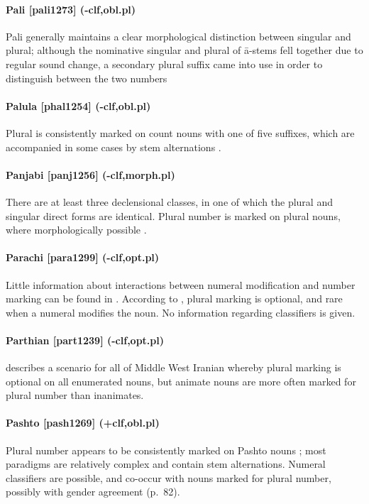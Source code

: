 \paragraph{Pali [pali1273] (-clf,obl.pl)}
Pali generally maintains a clear morphological distinction between singular and plural; although the nominative singular and plural of ā-stems fell together due to regular sound change, a secondary plural suffix came into use in order to distinguish between the two numbers \citep[150--1]{Oberlies2001}
\paragraph{Palula [phal1254] (-clf,obl.pl)}
Plural is consistently marked on count nouns with one of five suffixes, which are accompanied in some cases by stem alternations \citep[103--4]{Liljegren2016}.
\paragraph{Panjabi [panj1256] (-clf,morph.pl)}
There are at least three declensional classes, in one of which the plural and singular direct forms are identical. Plural number is marked on plural nouns, where morphologically possible \citep[214--5]{Bhatia1993}.
\paragraph{Parachi [para1299] (-clf,opt.pl)}
Little information about interactions between numeral modification and number marking can be found in \citet{Kieffer2009}. According to \citet[50]{Morgenstierne1929}, plural marking is optional, and rare when a numeral modifies the noun. No information regarding classifiers is given.
\paragraph{Parthian [part1239] (-clf,opt.pl)}
\citet[272]{DurkinMeisterernst2014} describes a scenario for all of Middle West Iranian whereby plural marking is optional on all enumerated nouns, but animate nouns are more often marked for plural number than inanimates.
\paragraph{Pashto [pash1269] (+clf,obl.pl)}
Plural number appears to be consistently marked on Pashto nouns \citep[45ff.]{Penzl1955}; most paradigms are relatively complex and contain stem alternations. Numeral classifiers are possible, and co-occur with nouns marked for plural number, possibly with gender agreement (p.\ 82).

